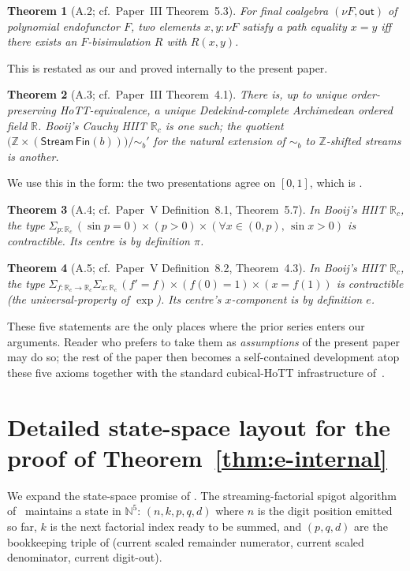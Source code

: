 \documentclass[12pt]{article}
\newtheorem{theorem}{Theorem}[section]
\theoremstyle{definition}
\theoremstyle{remark}
\newcommand{\N}{\mathbb{N}}
\newcommand{\Z}{\mathbb{Z}}
\newcommand{\R}{\mathbb{R}}
\newcommand{\Rc}{\R_c}
\newcommand{\Stream}{\mathsf{Stream}}
\newcommand{\out}{\mathsf{out}}
\newcommand{\bisim}{\mathrel{\sim}}
\begin{document}
\begin{theorem}[A.2; cf.\ Paper~III Theorem~5.3]\label{thm:app-coinduction}
For final coalgebra $(\nu F, \out)$ of polynomial endofunctor $F$,
two elements $x, y : \nu F$ satisfy a path equality $x = y$ iff
there exists an $F$-bisimulation $R$ with $R(x,y)$.
\end{theorem}
This is restated as our  and proved
internally to the present paper.

\begin{theorem}[A.3; cf.\ Paper~III Theorem~4.1]\label{thm:app-uniqueR}
There is, up to unique order-preserving HoTT-equivalence, a
unique Dedekind-complete Archimedean ordered field $\R$. Booij's
Cauchy HIIT $\Rc$ is one such; the quotient
$\bigl(\Z \times (\Stream\,\mathsf{Fin}(b))\bigr)/{\bisim_b'}$ for
the natural extension of $\bisim_b$ to $\Z$-shifted streams is
another.
\end{theorem}
We use this in the form: the two presentations agree on $[0,1]$,
which is .

\begin{theorem}[A.4; cf.\ Paper~V Definition~8.1, Theorem~5.7]\label{thm:app-pi}
In Booij's HIIT $\Rc$, the type
$\Sigma_{p:\Rc}\,(\sin p = 0)\times(p>0)\times(\forall x\in (0,p),\,\sin x>0)$
is contractible. Its centre is by definition $\pi$.
\end{theorem}

\begin{theorem}[A.5; cf.\ Paper~V Definition~8.2, Theorem~4.3]\label{thm:app-e}
In Booij's HIIT $\Rc$, the type
$\Sigma_{f:\Rc\to\Rc}\Sigma_{x:\Rc}\,(f'=f)\times(f(0)=1)\times(x = f(1))$
is contractible (the universal-property of $\exp$). Its centre's
$x$-component is by definition $e$.
\end{theorem}

These five statements are the only places where the prior series
enters our arguments. Reader who prefers to take them as
\emph{assumptions} of the present paper may do so; the rest of
the paper then becomes a self-contained development atop these
five axioms together with the standard cubical-HoTT
infrastructure of~\cite{cchm,ACS}.

\section{Detailed state-space layout for the proof of Theorem~\ref{thm:e-internal}}
\label{app:state}

We expand the state-space promise of .
The streaming-factorial spigot algorithm
of~\cite{sale-e-1968,gibbons-spigot} maintains a state in $\N^5$:
$(n, k, p, q, d)$ where $n$ is the digit position emitted so far,
$k$ is the next factorial index ready to be summed, and
$(p, q, d)$ are the bookkeeping triple of (current scaled
remainder numerator, current scaled denominator, current digit-out).
\end{document}

